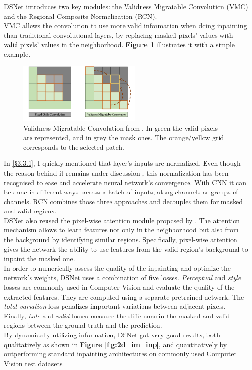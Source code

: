 \documentclass{article}
\begin{document}
DSNet introduces two key modules: the Validness Migratable Convolution (VMC) and the Regional Composite Normalization (RCN). \\
VMC allows the convolution to use more valid information when doing inpainting than traditional convolutional layers, by replacing masked pixels' values with valid pixels' values in the neighborhood. \textbf{Figure \ref{fig:dsnet_vmc}} illustrates it with a simple example.
\begin{figure}[H]
    \centering
    \includegraphics[height=3cm,width=\textwidth,keepaspectratio]{dsnet_vmc.png}
    \caption{Validness Migratable Convolution from \cite{DSNet}. In green the valid pixels are represented, and in grey the mask ones. The orange/yellow grid corresponds to the selected patch.}
    \label{fig:dsnet_vmc}
\end{figure}
In \hyperref[sec:cnn]{[\S3.3.1]}, I quickly mentioned that layer's inputs are normalized. Even though the reason behind it remains under discussion \cite{bn_ics,bn_smooth,bn_acc}, this normalization has been recognised to ease and accelerate neural network's convergence. With CNN it can be done in different ways: across a batch of inputs, along channels or groups of channels. RCN combines those three approaches and decouples them for masked and valid regions. \\
DSNet also reused the pixel-wise attention module proposed by \cite{pw_att}. The attention mechanism allows to learn features not only in the neighborhood but also from the background by identifying similar regions. Specifically, pixel-wise attention gives the network the ability to use features from the valid region's background to inpaint the masked one. \\

In order to numerically assess the quality of the inpainting and optimize the network's weights, DSNet uses a combination of five losses. \textit{Perceptual} and \textit{style} losses are commonly used in Computer Vision and evaluate the quality of the extracted features. They are computed using a separate pretrained network. The \textit{total variation} loss penalizes important variations between adjacent pixels. Finally, \textit{hole} and \textit{valid} losses measure the difference in the masked and valid regions between the ground truth and the prediction. \\
By dynamically utilizing information, DSNet got very good results, both qualitatively as shown in \textbf{Figure \ref{fig:2d_im_inp}}, and quantitatively by outperforming standard inpainting architectures on commonly used Computer Vision test datasets.
\end{document}
